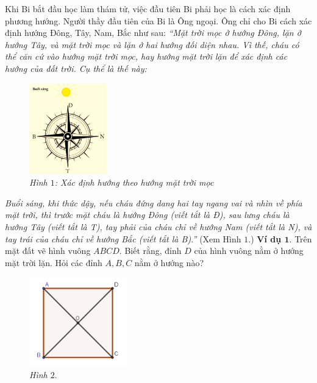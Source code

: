 \newpage
\graphicspath{{../timhieucungbi/hoclamthamtu/}}
\begingroup
{} %
\centering
\endgroup
\vspace*{25pt}
	Khi Bi bắt đầu học làm thám tử, việc đầu tiên Bi phải học là cách xác định phương hướng. Người thầy đầu tiên của Bi là Ông ngoại. Ông chỉ cho Bi cách xác định hướng Đông, Tây, Nam, Bắc như sau:
	\vskip 0.1cm
	\textit{“Mặt trời mọc ở hướng Đông, lặn ở hướng Tây, và mặt trời mọc và lặn ở hai hướng đối diện nhau. Vì thế, cháu có thể căn cứ vào hướng mặt trời mọc, hay hướng mặt trời lặn để xác định các hướng của đất trời. Cụ thể là thế này:}
	\vskip 0.1cm
	\begin{figure}
		\centering
		\vspace*{-15pt}
		\captionsetup{labelformat= empty, justification=centering}
		\includegraphics[width=0.3\textwidth]{pic1}
		\caption{\small\textit{Hình $1$: Xác định hướng theo hướng mặt trời mọc}}
		\vspace*{-10pt}
	\end{figure}
	\textit{Buổi sáng, khi thức dậy, nếu cháu đứng dang hai tay ngang vai và nhìn về phía mặt trời, thì trước mặt cháu là hướng Đông (viết tắt là \textnormal{Đ}), sau lưng cháu là hướng Tây (viết tắt là \textnormal{T}), tay phải của cháu chỉ về hướng Nam (viết tắt là \textnormal{N}), và tay trái của cháu chỉ về hướng Bắc (viết tắt là \textnormal{B}).”} (Xem Hình $1$.)
	\vskip 0.1cm
	\textbf{Ví dụ $\pmb1.$} Trên mặt đất vẽ hình vuông $ABCD$. Biết rằng, đỉnh $D$ của hình vuông nằm ở hướng mặt trời lặn. Hỏi các đỉnh $A, B, C$ nằm ở  hướng nào?
	\vskip 0.1cm
	\begin{figure}
		\centering
		\captionsetup{labelformat= empty, justification=centering}
		\includegraphics[width=0.38\textwidth]{pic2}
		\caption{\small\textit{Hình $2.$}}
		\vspace*{-15pt}
	\end{figure}
